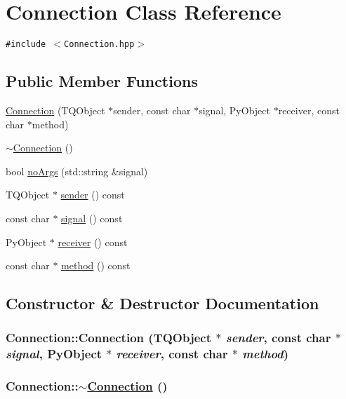 \hypertarget{classConnection}{
\section{Connection Class Reference}
\label{classConnection}
}
{\tt \#include $<$Connection.hpp$>$}

\subsection*{Public Member Functions}
\begin{CompactItemize}
\item 
\hyperlink{classConnection_a0}{Connection} (TQObject $\ast$sender, const char $\ast$signal, Py\-Object $\ast$receiver, const char $\ast$method)
\item 
\hyperlink{classConnection_a1}{$\sim$Connection} ()
\item 
bool \hyperlink{classConnection_a2}{no\-Args} (std::string \&signal)
\item 
TQObject $\ast$ \hyperlink{classConnection_a3}{sender} () const 
\item 
const char $\ast$ \hyperlink{classConnection_a4}{signal} () const 
\item 
Py\-Object $\ast$ \hyperlink{classConnection_a5}{receiver} () const 
\item 
const char $\ast$ \hyperlink{classConnection_a6}{method} () const 
\end{CompactItemize}


\subsection{Constructor \& Destructor Documentation}
\hypertarget{classConnection_a0}{
\subsubsection[Connection]{\setlength{\rightskip}{0pt plus 5cm}Connection::Connection (TQObject $\ast$ {\em sender}, const char $\ast$ {\em signal}, Py\-Object $\ast$ {\em receiver}, const char $\ast$ {\em method})}}
\label{classConnection_a0}


\hypertarget{classConnection_a1}{
\subsubsection[$\sim$Connection]{\setlength{\rightskip}{0pt plus 5cm}Connection::$\sim$\hyperlink{classConnection}{Connection} ()}}
\label{classConnection_a1}




